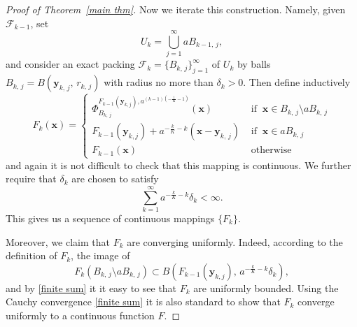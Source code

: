 \documentclass[10pt,a4paper]{amsart}
\def\epsilon{\varepsilon}
\def\ez{\epsilon}
\begin{document}
\begin{proof}[Proof of Theorem~\ref{main thm}]
Now we iterate this construction. Namely, given $\mathcal F_{k-1}$,   set 
$$U_k=\bigcup_{j=1}^\infty aB_{k-1,\,j},$$
and consider an exact packing $\mathcal F_k=\{B_{k,\,j}\}_{j=1}^\infty$ of
$U_k$ by balls $B_{k,\,j}=B(\mathbf {y}_{k,\,j},\,r_{k,\,j})$ with radius no more than $\delta_k>0$. Then define inductively
$$
F_k(\mathbf {x}) = \left\{ \begin{array}{ll}
\Phi^{F_{k-1}(\mathbf{y}_{k,j}),a^{(k-1)\left(-\frac{1}{K}-1\right)}}_{B_{k,\,j}}(\mathbf {x}) & \textrm{ if } \ \mathbf x\in B_{k,\,j}\setminus a B_{k,\,j}\\
F_{k-1}(\mathbf{y}_{k,j})+a^{-\frac {k} K-k}(\mathbf x-\mathbf {y}_{k,\,j})   & \textrm{ if } \  \mathbf x\in aB_{k,\,j}\\
F_{k-1}(\mathbf x) & \textrm{ otherwise }
\end{array} \right. $$
and again it is not difficult to check that this mapping is continuous. 
We further require that $\delta_k$ are chosen to satisfy
\begin{equation}\label{finite sum}
    \sum_{k=1}^\infty a^{-\frac k K-k} \delta_k<\infty. 
\end{equation}
This gives us a sequence of continuous mappings  $\{F_k\}$.


Moreover,  we claim that $F_k$ are converging uniformly. Indeed, according to the definition of $F_k$, the image of 
\begin{equation}\label{image}
F_k(B_{k,\,j}\setminus a B_{k,\,j})\subset  B(F_{k-1}(\mathbf{y}_{k,j}),\,a^{-\frac k K-k}\delta_k),
\end{equation}
and by \eqref{finite sum} it it easy to see that $F_k$ are uniformly bounded. Using the  Cauchy convergence \eqref{finite sum} it is also standard to show that $F_k$ converge uniformly to a continuous function $F$. 



\end{proof}
\end{document}
